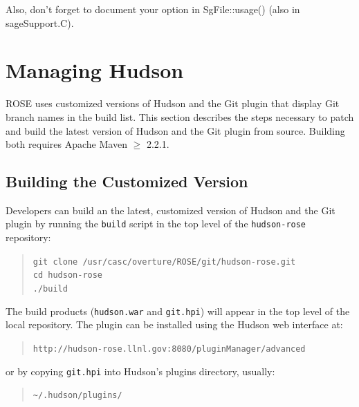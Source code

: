 Also, don't forget to document your option in SgFile::usage() (also in sageSupport.C).


\section{Managing Hudson}
ROSE uses customized versions of Hudson and the Git plugin that display Git branch names
in the build list. This section describes the steps necessary to patch
and build the latest version of Hudson and the Git plugin from source.
Building both requires Apache Maven $\geq$ 2.2.1. 

\subsection{Building the Customized Version}
Developers can build an the latest, customized version of Hudson and the
Git plugin by running the \texttt{build} script in the top level of the
\texttt{hudson-rose} repository:
\begin{quote}\texttt{git clone /usr/casc/overture/ROSE/git/hudson-rose.git \\
  cd hudson-rose \\
  ./build \\
}
\end{quote}
The build products (\texttt{hudson.war} and \texttt{git.hpi}) will
appear in the top level of the local repository. The plugin can be installed
using the Hudson web interface at:
\begin{quote}\texttt{http://hudson-rose.llnl.gov:8080/pluginManager/advanced}\end{quote}
or by copying \texttt{git.hpi} into Hudson's plugins directory, usually:
\begin{quote}\texttt{\~{}/.hudson/plugins/}\end{quote}


